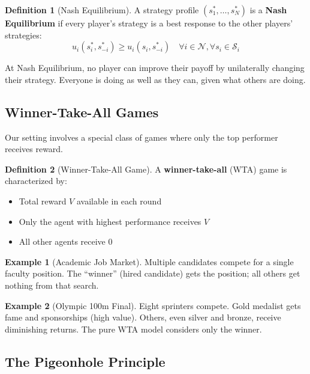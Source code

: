 \documentclass[11pt,a4paper]{article}
\theoremstyle{definition}
\newtheorem{definition}{Definition}[section]
\newtheorem{example}{Example}[section]
\theoremstyle{plain}
\begin{document}
\begin{definition}[Nash Equilibrium]
A strategy profile $(s_1^*, \ldots, s_N^*)$ is a \textbf{Nash Equilibrium} if every player's strategy is a best response to the other players' strategies:
\begin{equation}
u_i(s_i^*, s_{-i}^*) \geq u_i(s_i, s_{-i}^*) \quad \forall i \in \mathcal{N}, \forall s_i \in \mathcal{S}_i
\end{equation}
\end{definition}

\begin{intuition}
At Nash Equilibrium, no player can improve their payoff by unilaterally changing their strategy. Everyone is doing as well as they can, given what others are doing.
\end{intuition}

\subsection{Winner-Take-All Games}

Our setting involves a special class of games where only the top performer receives reward.

\begin{definition}[Winner-Take-All Game]
A \textbf{winner-take-all} (WTA) game is characterized by:
\begin{itemize}
    \item Total reward $V$ available in each round
    \item Only the agent with highest performance receives $V$
    \item All other agents receive 0
\end{itemize}
\end{definition}

\begin{example}[Academic Job Market]
Multiple candidates compete for a single faculty position. The ``winner'' (hired candidate) gets the position; all others get nothing from that search.
\end{example}

\begin{example}[Olympic 100m Final]
Eight sprinters compete. Gold medalist gets fame and sponsorships (high value). Others, even silver and bronze, receive diminishing returns. The pure WTA model considers only the winner.
\end{example}

\subsection{The Pigeonhole Principle}
\end{document}
